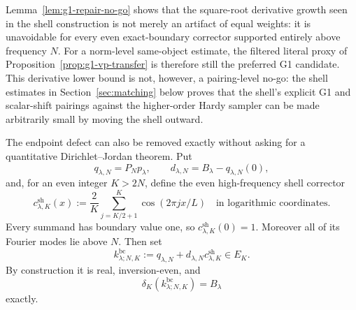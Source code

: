 \documentclass[11pt]{article}
\theoremstyle{remark}
\begin{document}
Lemma~\ref{lem:g1-repair-no-go} shows that the square-root derivative growth
seen in the shell construction is not merely an artifact of equal weights: it
is unavoidable for every even exact-boundary corrector supported entirely
above frequency $N$.  For a norm-level same-object estimate, the filtered
literal proxy of Proposition~\ref{prop:g1-vp-transfer} is therefore still the
preferred G1 candidate.  This derivative lower bound is not, however, a
pairing-level no-go: the shell estimates in Section~\ref{sec:matching} below proves that the
shell's explicit G1 and scalar-shift pairings against the higher-order Hardy
sampler can be made arbitrarily small by moving the shell outward.

The endpoint defect can also be removed exactly without asking for a
quantitative Dirichlet--Jordan theorem.  Put
\[
 q_{\lambda,N}=P_Np_\lambda,
 \qquad
 d_{\lambda,N}=B_\lambda-q_{\lambda,N}(0),
\]
and, for an even integer $K>2N$, define the even high-frequency shell
corrector
\begin{equation}\label{eq:g1-shell-corrector}
 c^{\mathrm{sh}}_{\lambda,K}(x)
 :=\frac{2}{K}\sum_{j=K/2+1}^{K}\cos(2\pi jx/L)
 \quad\text{in logarithmic coordinates}.
\end{equation}
Every summand has boundary value one, so
$c^{\mathrm{sh}}_{\lambda,K}(0)=1$.  Moreover all of its Fourier modes lie
above $N$.  Then set
\begin{equation}\label{eq:g1-bc-candidate}
 k^{\mathrm{bc}}_{\lambda;N,K}
 :=q_{\lambda,N}+d_{\lambda,N}c^{\mathrm{sh}}_{\lambda,K}\in E_K.
\end{equation}
By construction it is real, inversion-even, and
\begin{equation}\label{eq:g1-bc-boundary}
 \delta_K(k^{\mathrm{bc}}_{\lambda;N,K})=B_\lambda
\end{equation}
exactly.
\end{document}
